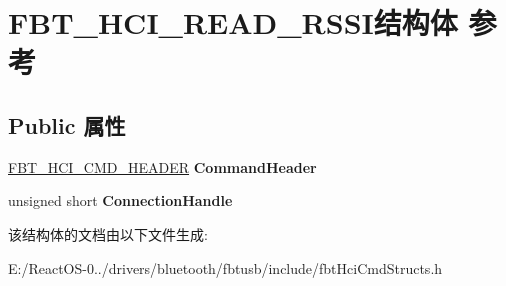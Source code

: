 \hypertarget{struct_f_b_t___h_c_i___r_e_a_d___r_s_s_i}{}\section{F\+B\+T\+\_\+\+H\+C\+I\+\_\+\+R\+E\+A\+D\+\_\+\+R\+S\+S\+I结构体 参考}
\label{struct_f_b_t___h_c_i___r_e_a_d___r_s_s_i}
\subsection*{Public 属性}
\begin{DoxyCompactItemize}
\item 
\mbox{\label{struct_f_b_t___h_c_i___r_e_a_d___r_s_s_i_af69f3e2e88c538952569ca648cf5f63d}} 
\hyperlink{struct_f_b_t___h_c_i___c_m_d___h_e_a_d_e_r}{F\+B\+T\+\_\+\+H\+C\+I\+\_\+\+C\+M\+D\+\_\+\+H\+E\+A\+D\+ER} {\bfseries Command\+Header}
\item 
\mbox{\label{struct_f_b_t___h_c_i___r_e_a_d___r_s_s_i_a4146613a250d6ecdbb34dfb7ee478fc3}} 
unsigned short {\bfseries Connection\+Handle}
\end{DoxyCompactItemize}


该结构体的文档由以下文件生成\+:\begin{DoxyCompactItemize}
\item 
E\+:/\+React\+O\+S-\/0../drivers/bluetooth/fbtusb/include/fbt\+Hci\+Cmd\+Structs.\+h\end{DoxyCompactItemize}
